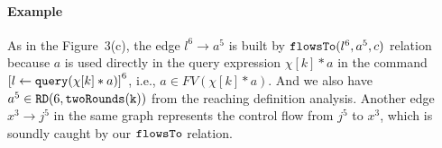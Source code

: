  \paragraph*{Example}
%
As in the Figure~3(c), 
the edge $l^6 \to a^5$ is built by $\mathtt{flowsTo}(l^6, a^5, c)$ relation because
$a$ is used directly in the query expression $\chi[k]*a$
in the command $\clabel{\assign{l}{\query(\chi[k]*a)}}^6$,
i.e., $a \in FV(\chi[k]*a)$.
And we also have $a^5 \in \mathtt{RD}(6, \mathtt{twoRounds(k)})$ from the reaching definition analysis.
Another edge $x^3 \to j^5$ in the same graph represents the control flow from $j^5$ to $x^3$, which is soundly caught by our $\mathtt{flowsTo}$ relation.
%


